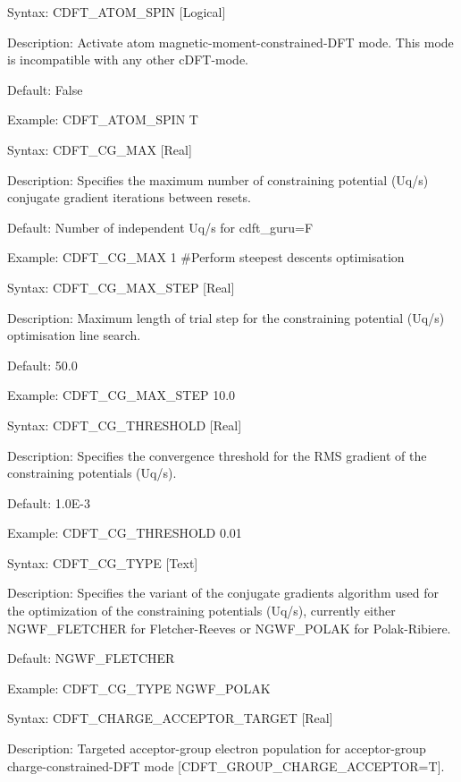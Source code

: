 \documentclass[letterpaper,10pt,english]{sphinxmanual}
\begin{document}
Syntax: CDFT\_ATOM\_SPIN {[}Logical{]}

Description: Activate atom magnetic-moment-constrained-DFT mode. This
mode is incompatible with any other cDFT-mode.

Default: False

Example: CDFT\_ATOM\_SPIN T


Syntax: CDFT\_CG\_MAX {[}Real{]}

Description: Specifies the maximum number of constraining potential
(Uq/s) conjugate gradient iterations between resets.

Default: Number of independent Uq/s for cdft\_guru=F

Example: CDFT\_CG\_MAX 1 \#Perform steepest descents optimisation


Syntax: CDFT\_CG\_MAX\_STEP {[}Real{]}

Description: Maximum length of trial step for the constraining potential
(Uq/s) optimisation line search.

Default: 50.0

Example: CDFT\_CG\_MAX\_STEP 10.0


Syntax: CDFT\_CG\_THRESHOLD {[}Real{]}

Description: Specifies the convergence threshold for the RMS gradient of
the constraining potentials (Uq/s).

Default: 1.0E-3

Example: CDFT\_CG\_THRESHOLD 0.01


Syntax: CDFT\_CG\_TYPE {[}Text{]}

Description: Specifies the variant of the conjugate gradients algorithm
used for the optimization of the constraining potentials (Uq/s),
currently either NGWF\_FLETCHER for Fletcher-Reeves or NGWF\_POLAK for
Polak-Ribiere.

Default: NGWF\_FLETCHER

Example: CDFT\_CG\_TYPE NGWF\_POLAK


Syntax: CDFT\_CHARGE\_ACCEPTOR\_TARGET {[}Real{]}

Description: Targeted acceptor-group electron population for
acceptor-group charge-constrained-DFT mode
{[}CDFT\_GROUP\_CHARGE\_ACCEPTOR=T{]}.
\end{document}
